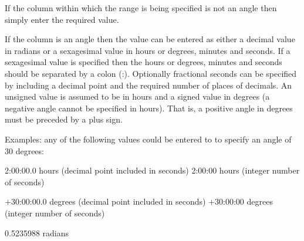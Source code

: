 \documentclass[twoside,11pt]{starlink}
\begin{document}
{{{         If the column within which the range is being specified is
         not an angle then simply enter the required value.

         If the column is an angle then the value can be entered as
         either a decimal value in radians or a sexagesimal value in
         hours or degrees, minutes and seconds.  If a sexagesimal value
         is specified then the hours or degrees, minutes and seconds
         should be separated by a colon (:).  Optionally fractional
         seconds can be specified by including a decimal point and the
         required number of places of decimals.  An unsigned value is
         assumed to be in hours and a signed value in degrees (a
         negative angle cannot be specified in hours).  That is,
         a positive angle in degrees must be preceded by a plus sign.

         Examples: any of the following values could be entered to
         to specify an angle of 30 degrees:

             2:00:00.0   hours (decimal point included in seconds)
             2:00:00     hours (integer number of seconds)

           $+$30:00:00.0   degrees (decimal point included in seconds)
           $+$30:00:00     degrees (integer number of seconds)

             0.5235988   radians
      }
      }}
\end{document}
